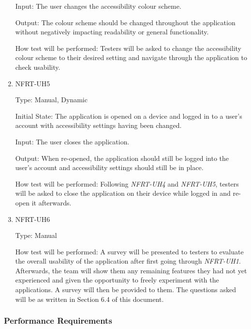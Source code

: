\documentclass[12pt, titlepage]{article}
\begin{document}
\begin{enumerate}
  Input: The user changes the accessibility colour scheme.
					
  Output: The colour scheme should be changed throughout the application without negatively impacting readability
  or general functionality.
  
  How test will be performed: Testers will be asked to change the accessibility colour scheme to their desired setting and
  navigate through the application to check usability.

  \item{NFRT-UH5\\}

  Type: Manual, Dynamic
					
  Initial State: The application is opened on a device and logged in to a user's account with accessibility settings
  having been changed.
					
  Input: The user closes the application.
					
  Output: When re-opened, the application should still be logged into the user's account and accessibility
  settings should still be in place.
  
  How test will be performed: Following \textit{NFRT-UH4} and \textit{NFRT-UH5}, testers will be asked to
  close the application on their device while logged in and re-open it afterwards.

  \item{NFRT-UH6\\}

  Type: Manual

  How test will be performed: A survey will be presented to testers to evaluate the overall usability of the
  application after first going through \textit{NFRT-UH1}. Afterwards, the team will show them any remaining features
  they had not yet experienced and given the opportunity to freely experiment with the applications. A survey will then be
  provided to them. The questions asked will be as written in Section 6.4 of this document.
\end{enumerate}

\subsubsection{Performance Requirements}
\end{document}
